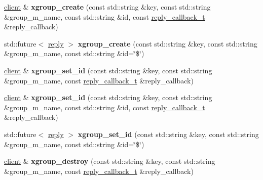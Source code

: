 \begin{DoxyCompactItemize}
\item 
\mbox{\label{classcpp__redis_1_1client_a7bcf21d1ddbe24ff42e0ee0135a665f9}} 
\mbox{\hyperlink{classcpp__redis_1_1client}{client}} \& {\bfseries xgroup\+\_\+create} (const std\+::string \&key, const std\+::string \&group\+\_\+m_name, const std\+::string \&id, const \mbox{\hyperlink{classcpp__redis_1_1client_af7a65eb21aa25230bfbb0b0203c4fc04}{reply\+\_\+callback\+\_\+t}} \&reply\+\_\+callback)
\item 
\mbox{\label{classcpp__redis_1_1client_ab275f61a685ecd5773aae3dea7865b05}} 
std\+::future$<$ \mbox{\hyperlink{classcpp__redis_1_1reply}{reply}} $>$ {\bfseries xgroup\+\_\+create} (const std\+::string \&key, const std\+::string \&group\+\_\+m_name, const std\+::string \&id=\char`\"{}\$\char`\"{})
\item 
\mbox{\label{classcpp__redis_1_1client_a537cac904fb4aa34c1b25d5c9cc86cc4}} 
\mbox{\hyperlink{classcpp__redis_1_1client}{client}} \& {\bfseries xgroup\+\_\+set\+\_\+id} (const std\+::string \&key, const std\+::string \&group\+\_\+m_name, const \mbox{\hyperlink{classcpp__redis_1_1client_af7a65eb21aa25230bfbb0b0203c4fc04}{reply\+\_\+callback\+\_\+t}} \&reply\+\_\+callback)
\item 
\mbox{\label{classcpp__redis_1_1client_a1bf822feb7c09dfb13a87e91ff68b1f9}} 
\mbox{\hyperlink{classcpp__redis_1_1client}{client}} \& {\bfseries xgroup\+\_\+set\+\_\+id} (const std\+::string \&key, const std\+::string \&group\+\_\+m_name, const std\+::string \&id, const \mbox{\hyperlink{classcpp__redis_1_1client_af7a65eb21aa25230bfbb0b0203c4fc04}{reply\+\_\+callback\+\_\+t}} \&reply\+\_\+callback)
\item 
\mbox{\label{classcpp__redis_1_1client_a4430aaf61ec70ddf2e5c16548452b159}} 
std\+::future$<$ \mbox{\hyperlink{classcpp__redis_1_1reply}{reply}} $>$ {\bfseries xgroup\+\_\+set\+\_\+id} (const std\+::string \&key, const std\+::string \&group\+\_\+m_name, const std\+::string \&id=\char`\"{}\$\char`\"{})
\item 
\mbox{\label{classcpp__redis_1_1client_a216e15a21d087ee51c1bfab7720ddcaa}} 
\mbox{\hyperlink{classcpp__redis_1_1client}{client}} \& {\bfseries xgroup\+\_\+destroy} (const std\+::string \&key, const std\+::string \&group\+\_\+m_name, const \mbox{\hyperlink{classcpp__redis_1_1client_af7a65eb21aa25230bfbb0b0203c4fc04}{reply\+\_\+callback\+\_\+t}} \&reply\+\_\+callback)

\end{DoxyCompactItemize}
